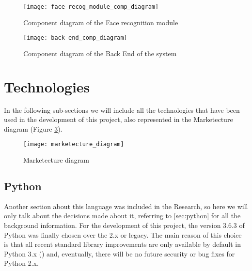 	\vspace{1.5cm}

	\begin{figure}[!ht]
		\centering
		\texttt{[image: face-recog\_module\_comp\_diagram]}
		\caption{Component diagram of the Face recognition module}
		\label{fig:face_recog_comp_diagram}
	\end{figure}	

	\clearpage

	\begin{figure}[!ht]
		\centering
		\texttt{[image: back-end\_comp\_diagram]}
		\caption{Component diagram of the Back End of the system}
		\label{fig:back_comp_diagram}
	\end{figure}	



                                                                                                 


\section{Technologies}
\label{sec:techs}
In the following sub-sections we will include all the technologies that have been used in the development of this project, also represented in the Marketecture diagram (Figure \ref{fig:marketecture_diagram}).

\vspace{1cm}

\begin{figure}[!ht]
	\centering
	\texttt{[image: marketecture\_diagram]}
	\caption{Marketecture diagram}
	\label{fig:marketecture_diagram}
\end{figure}	

	\clearpage

	\subsection{Python}
	Another section about this language was included in the Research, so here we will only talk about the decisions made about it, referring to \ref{sec:python} for all the background information. For the development of this project, the version 3.6.3 of Python was finally chosen over the 2.x or legacy. The main reason of this choice is that all recent standard library improvements are only available by default in Python 3.x (\cite{python_2or3}) and, eventually, there will be no future security or bug fixes for Python 2.x.

